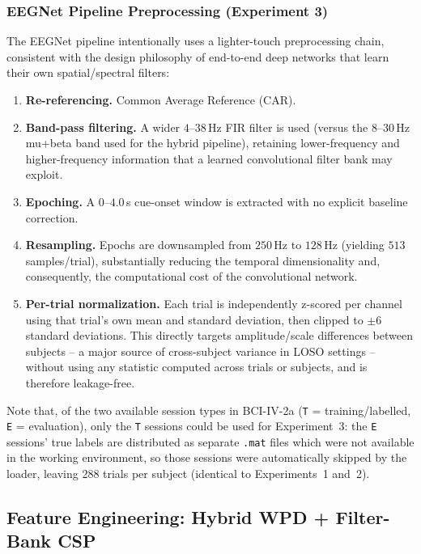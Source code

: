 \documentclass[11pt,a4paper]{article}
\begin{document}
\subsubsection{EEGNet Pipeline Preprocessing (Experiment 3)}
The EEGNet pipeline intentionally uses a lighter-touch preprocessing chain, consistent with the
design philosophy of end-to-end deep networks that learn their own spatial/spectral filters:
\begin{enumerate}[leftmargin=1.2cm]
    \item \textbf{Re-referencing.} Common Average Reference (CAR).
    \item \textbf{Band-pass filtering.} A wider $4$--$38$\,Hz FIR filter is used (versus the
    $8$--$30$\,Hz mu+beta band used for the hybrid pipeline), retaining lower-frequency and
    higher-frequency information that a learned convolutional filter bank may exploit.
    \item \textbf{Epoching.} A $0$--$4.0$\,s cue-onset window is extracted with no explicit
    baseline correction.
    \item \textbf{Resampling.} Epochs are downsampled from $250$\,Hz to $128$\,Hz (yielding
    $513$ samples/trial), substantially reducing the temporal dimensionality and, consequently, the
    computational cost of the convolutional network.
    \item \textbf{Per-trial normalization.} Each trial is independently z-scored per channel using
    that trial's own mean and standard deviation, then clipped to $\pm 6$ standard deviations. This
    directly targets amplitude/scale differences between subjects -- a major source of cross-subject
    variance in LOSO settings -- without using any statistic computed across trials or subjects, and
    is therefore leakage-free.
\end{enumerate}
Note that, of the two available session types in BCI-IV-2a (\texttt{T} = training/labelled,
\texttt{E} = evaluation), only the \texttt{T} sessions could be used for Experiment~3: the \texttt{E}
sessions' true labels are distributed as separate \texttt{.mat} files which were not available in the
working environment, so those sessions were automatically skipped by the loader, leaving 288 trials
per subject (identical to Experiments~1 and~2).

\subsection{Feature Engineering: Hybrid WPD + Filter-Bank CSP}
\label{sec:features}
\end{document}
